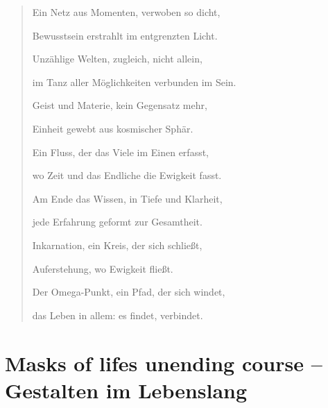 \documentclass[
  ngerman,
]{article}
\begin{document}
\begin{quote}
Ein Netz aus Momenten, verwoben so dicht,

Bewusstsein erstrahlt im entgrenzten Licht.

Unzählige Welten, zugleich, nicht allein,

im Tanz aller Möglichkeiten verbunden im Sein.

Geist und Materie, kein Gegensatz mehr,

Einheit gewebt aus kosmischer Sphär\textquotesingle.

Ein Fluss, der das Viele im Einen erfasst,

wo Zeit und das Endliche die Ewigkeit fasst.

Am Ende das Wissen, in Tiefe und Klarheit,

jede Erfahrung geformt zur Gesamtheit.

Inkarnation, ein Kreis, der sich schließt,

Auferstehung, wo Ewigkeit fließt.

Der Omega-Punkt, ein Pfad, der sich windet,

das Leben in allem: es findet, verbindet.
\end{quote}

\section{\texorpdfstring{\textbf{Masks of life\textquotesingle s
unending course -- Gestalten im
Lebenslang}}{Masks of life\textquotesingle s unending course -- Gestalten im Lebenslang}}\label{masks-of-lifes-unending-course-gestalten-im-lebenslang}
\end{document}
